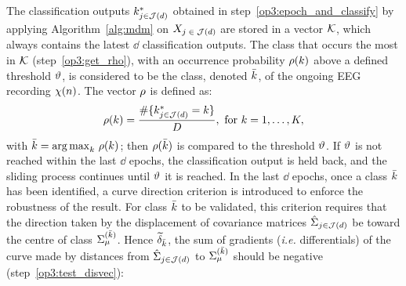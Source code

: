 The classification outputs $k^*_{j \in \mathcal{J}(d)}$ obtained in step~\ref{op3:epoch_and_classify} by applying Algorithm~\ref{alg:mdm} on $X_{\operatorname{\text{\ensuremath{j \in \mathcal{J}(d)}}}}$ are stored in a vector $\mathcal{K}$, 
which always contains the latest $\dd$ classification outputs.
The class that occurs the most in $\mathcal{K}$ (step~\ref{op3:get_rho}), with an occurrence probability $\rho(k)$ above a defined threshold $\vartheta$, 
is considered to be the class, denoted $\bar{k}$, of the ongoing EEG recording $\chi(n)$. 
The vector $\rho$ is defined as:
\begin{equation}
\label{eq:occ_prob}
  \pocc(\ci) = \frac{\#\{ \clout_{\tj \in \Dindex(d)} = \ci \}}{\dd}, \text{ for } \ci = 1, \ldots, \dK,
\end{equation}
with $\bar{k} = {\operatorname*{arg\,max}}_{k} \ \rho(k)$; %
then $\rho(\bar{k})$ is compared to the threshold $\vartheta$.
If $\vartheta$ is not reached within the last $\dd$ epochs, the classification output is held back, and the sliding process continues until $\vartheta$ it is reached. 
In the last $\dd$ epochs, once a class $\bar{k}$ has been identified,  a curve direction criterion is introduced to enforce the robustness of the result.  
For class $\bar{k}$ to be validated, this criterion requires that the direction taken by the displacement of covariance matrices $\hat{\Sigma}_{\operatorname{\textit{\ensuremath{j}} \in \mathcal{J}(\textit{\ensuremath{d}})}}$ be toward the centre of class $\Sigma_{\mu}^{(\bar{k})}$. %
Hence $\widetilde{\delta}_{\bar{k}}$, the sum of gradients (\textit{i.e.} differentials) of the curve made by distances from $\hat{\Sigma}_{\operatorname{ \textit{\ensuremath{j}} \in \mathcal{J}(\textit{\ensuremath{d}})}}$ to $\Sigma_{\mu}^{(\bar{k})}$ should be negative (step~\ref{op3:test_disvec}):
